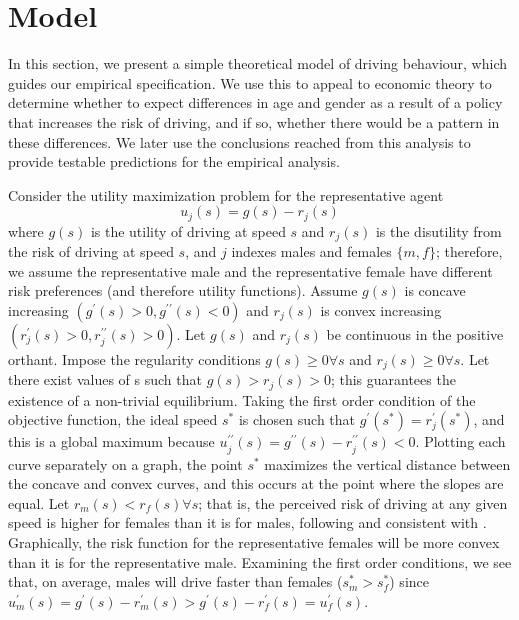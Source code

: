 \section{Model}
\label{sec:Model}

In this section, we present a simple theoretical model of driving behaviour, 
%
which guides our empirical specification. 
%
We use this to appeal to economic theory to determine whether to expect 
differences in age and gender as a result of a policy that increases the risk of driving, 
and if so, whether there would be a pattern in these differences. 
% 
We later use the conclusions reached from this analysis 
to provide testable predictions for the empirical analysis.  

Consider the utility maximization problem 
for the representative agent
%
$$
	u_j (s) = g(s) - r_j (s)
$$
% 
where $g(s)$ is the utility of driving at speed $s$ 
and $r_j (s)$ is the disutility from the risk of driving at speed $s$, 
and $j$ indexes males and females $\{m,f\}$;
% 
therefore, we assume the representative male and the representative female 
have different risk preferences (and therefore utility functions). 
% 
Assume $g(s)$ is concave increasing $(g^{\prime} (s)>0, 
g^{\prime\prime} (s)<0)$ 
and $r_j (s)$ is convex increasing $(r_j^{\prime} (s)>0, r_j^{\prime\prime} (s)>0)$. 
Let $g(s)$ and $r_j (s)$ be continuous in the positive orthant. 
Impose the regularity conditions $g(s)\geq0 \forall s$ and $r_j (s)\geq0 \forall s$. 
Let there exist values of s such that $g(s)>r_j (s)>0$; 
this guarantees the existence of a non-trivial equilibrium. 
Taking the first order condition of the objective function, 
the ideal speed $s^*$ is chosen such that $g^{\prime} (s^*)=r_j^{\prime} (s^*)$, 
and this is a global maximum because 
$u_j^{\prime\prime} (s)=g^{\prime\prime} (s)-r_j^{\prime\prime} (s)<0$. 
Plotting each curve separately on a graph, 
the point $s^*$ maximizes the vertical distance between the concave and convex curves,
and this occurs at the point where the slopes are equal. 
Let $r_m (s)<r_f (s)  \forall s$; 
that is, the perceived risk of driving at any given speed 
is higher for females than it is for males, 
following 
\citet{harris2006}
and consistent with
\citet{crosongneezy2009}.
Graphically, the risk function for the representative females will be more convex than it is for the representative male. 
Examining the first order conditions, 
we see that, on average, males will drive faster than females ($s_m^*>s_f^*$) 
since 
$u_m^{\prime} (s)
=g^{\prime} (s)-r_m^{\prime} (s)
>g^{\prime} (s)-r_f^{\prime} (s)
=u_f^{\prime} (s)$. \\


